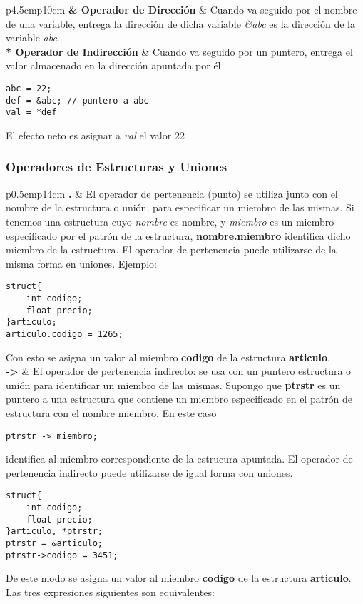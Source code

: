 \begin{tabular}{p{4.5cm}p{10cm}}
\textbf{\& Operador de Dirección} & Cuando va seguido por el nombre de una variable, entrega la dirección de dicha variable \textit{\&abc} es la dirección de la variable \textit{abc}.\\
\textbf{* Operador de Indirección} & Cuando va seguido por un puntero, entrega el valor almacenado en la dirección apuntada por él

\begin{lstlisting}[style=Cpp]
abc = 22;
def = &abc; // puntero a abc
val = *def
\end{lstlisting}
El efecto neto es asignar a \textit{val} el valor 22\\
\end{tabular}

\subsubsection{Operadores de Estructuras y Uniones}
\begin{tabular}{p{0.5cm}p{14cm}}
\textbf{.} & 
El operador de pertenencia (punto) se utiliza junto con el nombre de la estructura o unión, para especificar un miembro de las mismas. Si tenemos una estructura cuyo \textit{nombre} es nombre, y \textit{miembro} es un miembro especificado por el patrón de la estructura, \textbf{nombre.miembro} identifica dicho miembro de la estructura. El operador de pertenencia puede utilizarse de la misma forma en uniones. Ejemplo:
\begin{lstlisting}[style=Cpp]
struct{
	int codigo;
	float precio;
}articulo;
articulo.codigo = 1265;
\end{lstlisting}
Con esto se asigna un valor al miembro \textbf{codigo} de la estructura \textbf{articulo}.\\
\textbf{->} & 
El operador de pertenencia indirecto: se usa con un puntero estructura o unión para identificar un miembro de las mismas. Supongo que \textbf{ptrstr} es un puntero a una estructura que contiene un miembro especificado en el patrón de estructura con el nombre miembro. En este caso
\begin{lstlisting}[style=Cpp]
ptrstr -> miembro;
\end{lstlisting}
identifica al miembro correspondiente de la estrucura apuntada. El operador de pertenencia indirecto puede utilizarse de igual forma con uniones.
\begin{lstlisting}[style=Cpp]
struct{
	int codigo;
	float precio;
}articulo, *ptrstr;
ptrstr = &articulo;
ptrstr->codigo = 3451;
\end{lstlisting}
De este modo se asigna un valor al miembro \textbf{codigo} de la estructura \textbf{articulo}. Las tres expresiones siguientes son equivalentes:

  
\\
\end{tabular}


